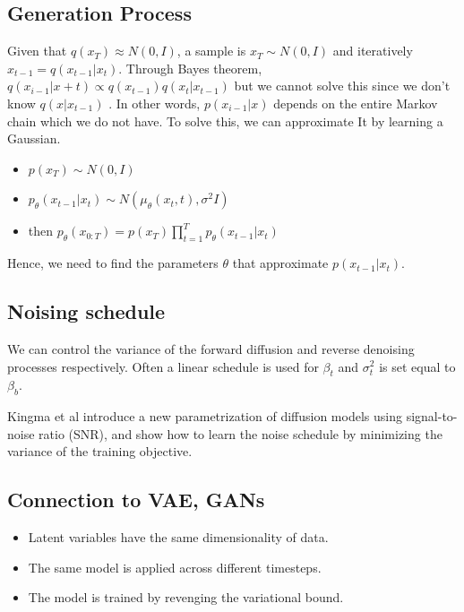 \documentclass{article}
\begin{document}
\subsection{Generation Process}\label{generation-process}

Given that \(q(x_T)\approx N(0, I)\), a sample is \(x_T\sim N(0, I)\)
and iteratively \(x_{t-1}=q(x_{t-1}|x_t)\). Through Bayes theorem,
\(q(x_{i-1}|x+t) \propto q(x_{t-1})q(x_t|x_{t-1})\) but we cannot solve
this since we don't know \(q(x|x_{t-1})\) . In other words,
\(p(x_{i-1}|x)\) depends on the entire Markov chain which we do not
have. To solve this, we can approximate It by learning a Gaussian.

\begin{itemize}
\tightlist
\item
  \(p(x_T)\sim N(0, I)\)
\item
  \(p_{\theta}(x_{t-1}|x_t)\sim N(\mu_{\theta}(x_t, t), \sigma^2 I)\)
\item
  then
  \(p_{\theta}(x_{0:T})=p(x_T)\prod_{t=1}^{T}p_{\theta}(x_{t-1}|x_t)\)
\end{itemize}

Hence, we need to find the parameters \(\theta\) that approximate
\(p(x_{t-1}|x_t)\).

\subsection{Noising schedule}\label{noising-schedule}

We can control the variance of the forward diffusion and reverse
denoising processes respectively. Often a linear schedule is used for
\(\beta_t\) and \(\sigma^2_t\) is set equal to \(\beta_b\).

Kingma et al introduce a new parametrization of diffusion models using
signal-to-noise ratio (SNR), and show how to learn the noise schedule by
minimizing the variance of the training objective.

\subsection{Connection to VAE, GANs}\label{connection-to-vae-gans}

\begin{itemize}
\tightlist
\item
  Latent variables have the same dimensionality of data.
\item
  The same model is applied across different timesteps.
\item
  The model is trained by revenging the variational bound.
\end{itemize}
\end{document}
